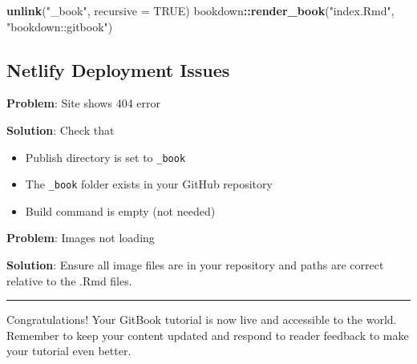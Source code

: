\documentclass[
]{book}
\newenvironment{Shaded}{\begin{snugshade}}{\end{snugshade}}
\newcommand{\AttributeTok}[1]{\textcolor[rgb]{0.13,0.29,0.53}{#1}}
\newcommand{\ConstantTok}[1]{\textcolor[rgb]{0.56,0.35,0.01}{#1}}
\newcommand{\FunctionTok}[1]{\textcolor[rgb]{0.13,0.29,0.53}{\textbf{#1}}}
\newcommand{\NormalTok}[1]{#1}
\newcommand{\SpecialCharTok}[1]{\textcolor[rgb]{0.81,0.36,0.00}{\textbf{#1}}}
\newcommand{\StringTok}[1]{\textcolor[rgb]{0.31,0.60,0.02}{#1}}
\providecommand{\tightlist}{%
  \setlength{\itemsep}{0pt}\setlength{\parskip}{0pt}}
\begin{document}
\begin{Shaded}
\begin{Highlighting}[]
\FunctionTok{unlink}\NormalTok{(}\StringTok{"\_book"}\NormalTok{, }\AttributeTok{recursive =} \ConstantTok{TRUE}\NormalTok{)}
\NormalTok{bookdown}\SpecialCharTok{::}\FunctionTok{render\_book}\NormalTok{(}\StringTok{"index.Rmd"}\NormalTok{, }\StringTok{"bookdown::gitbook"}\NormalTok{)}
\end{Highlighting}
\end{Shaded}

\subsection{Netlify Deployment Issues}\label{netlify-deployment-issues}

\textbf{Problem}: Site shows 404 error

\textbf{Solution}: Check that

\begin{itemize}
\tightlist
\item
  Publish directory is set to \texttt{\_book}
\item
  The \texttt{\_book} folder exists in your GitHub repository
\item
  Build command is empty (not needed)
\end{itemize}

\textbf{Problem}: Images not loading

\textbf{Solution}: Ensure all image files are in your repository and paths are correct relative to the .Rmd files.

\begin{center}\rule{0.5\linewidth}{0.5pt}\end{center}

Congratulations! Your GitBook tutorial is now live and accessible to the world. Remember to keep your content updated and respond to reader feedback to make your tutorial even better.


\end{document}
